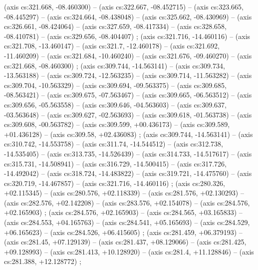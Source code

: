     (axis cs:321.668,    -08.460300) --  (axis cs:322.667,    -08.452715) --  (axis cs:323.665,    -08.445297) --  (axis cs:324.664,    -08.438048) --  (axis cs:325.662,    -08.430969) --  (axis cs:326.661,    -08.424064) --  (axis cs:327.659,    -08.417334) --  (axis cs:328.658,    -08.410781) --  (axis cs:329.656,    -08.404407) ;
    (axis cs:321.716,    -14.460116) --  (axis cs:321.708,    -13.460147) --  (axis cs:321.7,    -12.460178) --  (axis cs:321.692,    -11.460209) --  (axis cs:321.684,    -10.460240) --  (axis cs:321.676,    -09.460270) --  (axis cs:321.668,    -08.460300) ;
    (axis cs:309.744,    -14.563141) --  (axis cs:309.734,    -13.563188) --  (axis cs:309.724,    -12.563235) --  (axis cs:309.714,    -11.563282) --  (axis cs:309.704,    -10.563329) --  (axis cs:309.694,    -09.563375) --  (axis cs:309.685,    -08.563421) --  (axis cs:309.675,    -07.563467) --  (axis cs:309.665,    -06.563512) --  (axis cs:309.656,    -05.563558) --  (axis cs:309.646,    -04.563603) --  (axis cs:309.637,    -03.563648) --  (axis cs:309.627,    -02.563693) --  (axis cs:309.618,    -01.563738) --  (axis cs:309.608,    -00.563782) --  (axis cs:309.599,    +00.436173) --  (axis cs:309.589,    +01.436128) --  (axis cs:309.58,    +02.436083) ;
    (axis cs:309.744,    -14.563141) --  (axis cs:310.742,    -14.553758) --  (axis cs:311.74,    -14.544512) --  (axis cs:312.738,    -14.535405) --  (axis cs:313.735,    -14.526439) --  (axis cs:314.733,    -14.517617) --  (axis cs:315.731,    -14.508941) --  (axis cs:316.729,    -14.500415) --  (axis cs:317.726,    -14.492042) --  (axis cs:318.724,    -14.483822) --  (axis cs:319.721,    -14.475760) --  (axis cs:320.719,    -14.467857) --  (axis cs:321.716,    -14.460116) ;
    (axis cs:280.326,    +02.115345) --  (axis cs:280.576,    +02.118339) --  (axis cs:281.576,    +02.130293) --  (axis cs:282.576,    +02.142208) --  (axis cs:283.576,    +02.154078) --  (axis cs:284.576,    +02.165903) ;
    (axis cs:284.576,    +02.165903) --  (axis cs:284.565,    +03.165833) --  (axis cs:284.553,    +04.165763) --  (axis cs:284.541,    +05.165693) --  (axis cs:284.529,    +06.165623) --  (axis cs:284.526,    +06.415605) ;
    (axis cs:281.459,    +06.379193) --  (axis cs:281.45,    +07.129139) --  (axis cs:281.437,    +08.129066) --  (axis cs:281.425,    +09.128993) --  (axis cs:281.413,    +10.128920) --  (axis cs:281.4,    +11.128846) --  (axis cs:281.388,    +12.128772) ;
